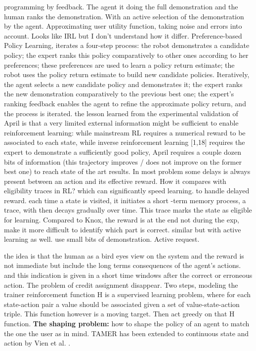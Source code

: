 \cite{akrour2014programming} programming by feedback. The agent it doing the full demonstration and the human ranks the demonstration. With an active selection of the demonstration by the agent. Approximating user utility function, taking noise and errors into account. Looks like IRL but I don't understand how it differ.
\cite{akrour2011preference} Preference-based Policy Learning, iterates a four-step process: the robot demonstrates a candidate policy; the expert ranks this policy comparatively to other ones according to her preferences; these preferences are used to learn a policy return estimate; the robot uses the policy return estimate to build new candidate policies.
\cite{akrour2012april} Iteratively, the agent selects a new candidate policy and demonstrates it; the expert ranks the new demonstration comparatively to the previous best one; the expert's ranking feedback enables the agent to refine the approximate policy return, and the process is iterated. the lesson learned from the experimental validation of April is that a very
limited external information might be sufficient to enable reinforcement learning: while mainstream RL requires a numerical reward to be associated to each state, while inverse reinforcement learning [1,18] requires the expert to demonstrate a sufficiently good policy, April requires a couple dozen bits of information (this trajectory improves / does not improve on the former best one) to reach state of the art results. In most problem some delays is always present between an action and its effective reward. How it compares with eligibility traces \cite{sutton1998reinforcement} in RL? which can significantly speed learning. to handle delayed reward. each time a state is visited, it initiates a short -term memory process, a trace, with then decays gradually over time. This trace marks the state as eligible for learning. Compared to Knox, the reward is at the end not during the exp, make it more difficult to identify which part is correct. \cite{wilson2012bayesian} similar but with active learning as well. use small bits of demonstration. Active request.


\cite{knox2009interactively} the idea is that the human as a bird eyes view on the system and the reward is not immediate but include the long terms consequences of the agent's actions. and this indication is given in a short time windows after the correct or erroneous action. The problem of credit assignment disappear.
Two steps, modeling the trainer reinforcement function H is a supervised learning problem, where for each state-action pair a value should be associated given a set of value-state-action triple. This function however is a moving target. Then act greedy on that H function.
\textbf{The shaping problem:} how to shape the policy of an agent to match the one the user as in mind. 
TAMER has been extended to continuous state and action by Vien et al. \cite{vien2013learning}.


